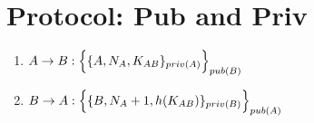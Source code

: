 \section{Protocol: Pub and Priv}

\begin{enumerate}
    \item $ A \rightarrow B : \Bigl\{ \{A, N_A, K_{AB}\}_{priv(A)}\Bigr\}_{pub(B)}$
    \item $ B \rightarrow A : \Bigl\{ \{B, N_A +1,h(K_{AB})\}_{priv(B)}\Bigr\}_{pub(A)}$

\end{enumerate}